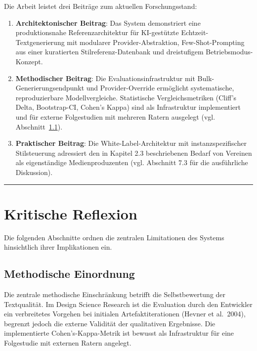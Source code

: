 Die Arbeit leistet drei Beiträge zum aktuellen Forschungsstand:

\begin{enumerate}
\def\labelenumi{\arabic{enumi}.}
\item
  \textbf{Architektonischer Beitrag}: Das System demonstriert eine
  produktionsnahe Referenzarchitektur für KI-gestützte
  Echtzeit-Textgenerierung mit modularer Provider-Abstraktion,
  Few-Shot-Prompting aus einer kuratierten Stilreferenz-Datenbank und
  dreistufigem Betriebsmodus-Konzept.
\item
  \textbf{Methodischer Beitrag}: Die Evaluationsinfrastruktur mit
  Bulk-Generierungsendpunkt und Provider-Override ermöglicht systematische,
  reproduzierbare Modellvergleiche. Statistische Vergleichsmetriken
  (Cliff's Delta, Bootstrap-CI, Cohen's Kappa) sind als Infrastruktur
  implementiert und für externe Folgestudien mit mehreren Ratern ausgelegt
  (vgl. Abschnitt~\ref{methodische-einordnung}).
\item
  \textbf{Praktischer Beitrag}: Die White-Label-Architektur mit
  instanzspezifischer Stilsteuerung adressiert den in Kapitel 2.3
  beschriebenen Bedarf von Vereinen als eigenständige Medienproduzenten
  (vgl. Abschnitt 7.3 für die ausführliche Diskussion).
\end{enumerate}

\begin{center}\rule{0.5\linewidth}{0.5pt}\end{center}

\section{Kritische Reflexion}\label{kritische-reflexion}

Die folgenden Abschnitte ordnen die zentralen Limitationen des Systems
hinsichtlich ihrer Implikationen ein.

\subsection{Methodische Einordnung}\label{methodische-einordnung}

Die zentrale methodische Einschränkung betrifft die Selbstbewertung der
Textqualität. Im Design Science Research ist die Evaluation durch den
Entwickler ein verbreitetes Vorgehen bei initialen Artefaktiterationen
(Hevner et al.~2004), begrenzt jedoch die externe Validität der
qualitativen Ergebnisse. Die implementierte Cohen's-Kappa-Metrik ist
bewusst als Infrastruktur für eine Folgestudie mit externen Ratern
angelegt.

